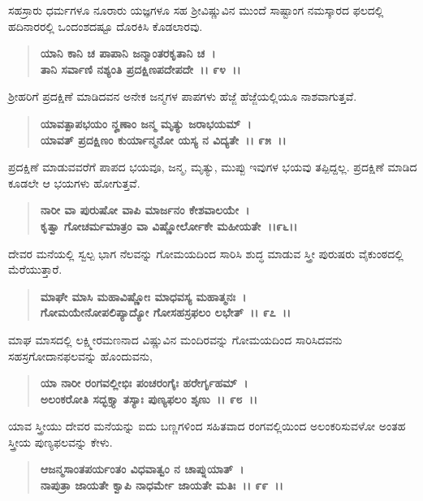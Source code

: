 ಸಹಸ್ರಾರು ಧರ್ಮಗಳೂ ನೂರಾರು ಯಜ್ಞಗಳೂ ಸಹ ಶ‍್ರೀವಿಷ್ಣುವಿನ ಮುಂದೆ ಸಾಷ್ಟಾಂಗ ನಮಸ್ಕಾರದ ಫಲದಲ್ಲಿ ಹದಿನಾರರಲ್ಲಿ ಒಂದಂಶದಷ್ಟೂ ದೊರಕಿಸಿ ಕೊಡಲಾರವು.

\begin{verse}
\textbf{ಯಾನಿ ಕಾನಿ ಚ ಪಾಪಾನಿ ಜನ್ಮಾಂತರಕೃತಾನಿ ಚ~।}\\\textbf{ತಾನಿ ಸರ್ವಾಣಿ ನಶ್ಯಂತಿ ಪ್ರದಕ್ಷಿಣಪದೇಪದೇ~।। ೯೪~।। }
\end{verse}

ಶ‍್ರೀಹರಿಗೆ ಪ್ರದಕ್ಷಿಣೆ ಮಾಡಿದವನ ಅನೇಕ ಜನ್ಮಗಳ ಪಾಪಗಳು ಹೆಜ್ಜೆ ಹೆಜ್ಜೆಯಲ್ಲಿಯೂ ನಾಶವಾಗುತ್ತವೆ.

\begin{verse}
\textbf{ಯಾವತ್ಪಾಪಭಯಂ ನೄಣಾಂ ಜನ್ಮ ಮೃತ್ಯು ಜರಾಭಯಮ್~।}\\\textbf{ಯಾವತ್ ಪ್ರದಕ್ಷಿಣಂ ಕುರ್ಯಾನ್ಮನೋ ಯಸ್ಯ ನ ವಿದ್ಯತೇ~।। ೯೫~।।}
\end{verse}

ಪ್ರದಕ್ಷಿಣೆ ಮಾಡುವವರೆಗೆ ಪಾಪದ ಭಯವೂ, ಜನ್ಮ, ಮೃತ್ಯು, ಮುಪ್ಪು ಇವುಗಳ ಭಯವು ತಪ್ಪಿದ್ದಲ್ಲ. ಪ್ರದಕ್ಷಿಣೆ ಮಾಡಿದ ಕೂಡಲೇ ಆ ಭಯಗಳು ಹೋಗುತ್ತವೆ.

\begin{verse}
\textbf{ನಾರೀ ವಾ ಪುರುಷೋ ವಾಪಿ ಮಾರ್ಜನಂ ಕೇಶವಾಲಯೇ~।}\\\textbf{ಕೃತ್ವಾ ಗೋಚರ್ಮಮಾತ್ರಂ ವಾ ವಿಷ್ಣೋರ್ಲೋಕೇ ಮಹೀಯತೇ~।।೯೬।।}
\end{verse}

ದೇವರ ಮನೆಯಲ್ಲಿ ಸ್ವಲ್ಪ ಭಾಗ ನೆಲವನ್ನು ಗೋಮಯದಿಂದ ಸಾರಿಸಿ ಶುದ್ಧ ಮಾಡುವ ಸ್ತ್ರೀ ಪುರುಷರು ವೈಕುಂಠದಲ್ಲಿ ಮೆರೆಯುತ್ತಾರೆ.

\begin{verse}
\textbf{ಮಾಘೇ ಮಾಸಿ ಮಹಾವಿಷ್ಣೋಃ ಮಾಧವಸ್ಯ ಮಹಾತ್ಮನಃ~।}\\\textbf{ಗೋಮಯೇನೋಪಲಿಪ್ಯಾದ್ಯೋ ಗೋಸಹಸ್ರಫಲಂ ಲಭೇತ್~।। ೯೭~।।}
\end{verse}

ಮಾಘ ಮಾಸದಲ್ಲಿ ಲಕ್ಷ್ಮೀರಮಣನಾದ ವಿಷ್ಣುವಿನ ಮಂದಿರವನ್ನು ಗೋಮಯದಿಂದ ಸಾರಿಸಿದವನು ಸಹಸ್ರಗೋದಾನಫಲವನ್ನು ಹೊಂದುವನು,

\begin{verse}
\textbf{ಯಾ ನಾರೀ ರಂಗವಲ್ಲೀಭಿಃ ಪಂಚರಂಗೈಃ ಹರೇರ್ಗೃಹಮ್~।}\\\textbf{ಅಲಂಕರೋತಿ ಸದ್ಭಕ್ತ್ಯಾ ತಸ್ಯಾಃ ಪುಣ್ಯಫಲಂ ಶೃಣು~।। ೯೮~।।}
\end{verse}

ಯಾವ ಸ್ತ್ರೀಯು ದೇವರ ಮನೆಯನ್ನು ಐದು ಬಣ್ಣಗಳಿಂದ ಸಹಿತವಾದ ರಂಗವಲ್ಲಿಯಿಂದ ಅಲಂಕರಿಸುವಳೋ ಅಂತಹ ಸ್ತ್ರೀಯ ಪುಣ್ಯಫಲವನ್ನು ಕೇಳು.

\begin{verse}
\textbf{ಆಜನ್ಮಸಾಂತಪರ್ಯಂತಂ ವಿಧವಾತ್ವಂ ನ ಚಾಪ್ನುಯಾತ್~।}\\\textbf{ನಾಪುತ್ರಾ ಜಾಯತೇ ಕ್ವಾಪಿ ನಾಧರ್ಮೇ ಜಾಯತೇ ಮತಿಃ~।। ೯೯~।।}
\end{verse}

